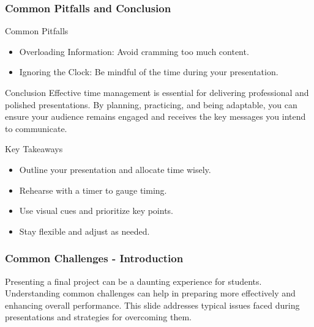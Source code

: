 \documentclass[aspectratio=169]{beamer}
\begin{document}
\begin{frame}[fragile]
    \frametitle{Common Pitfalls and Conclusion}
    \begin{block}{Common Pitfalls}
        \begin{itemize}
            \item Overloading Information: Avoid cramming too much content.
            \item Ignoring the Clock: Be mindful of the time during your presentation.
        \end{itemize}
    \end{block}
    
    \begin{block}{Conclusion}
        Effective time management is essential for delivering professional and polished presentations. By planning, practicing, and being adaptable, you can ensure your audience remains engaged and receives the key messages you intend to communicate.
    \end{block}
    
    \begin{block}{Key Takeaways}
        \begin{itemize}
            \item Outline your presentation and allocate time wisely.
            \item Rehearse with a timer to gauge timing.
            \item Use visual cues and prioritize key points.
            \item Stay flexible and adjust as needed.
        \end{itemize}
    \end{block}
\end{frame}

\begin{frame}[fragile]
  \frametitle{Common Challenges - Introduction}
  Presenting a final project can be a daunting experience for students. Understanding common challenges can help in preparing more effectively and enhancing overall performance. This slide addresses typical issues faced during presentations and strategies for overcoming them.
\end{frame}
\end{document}
